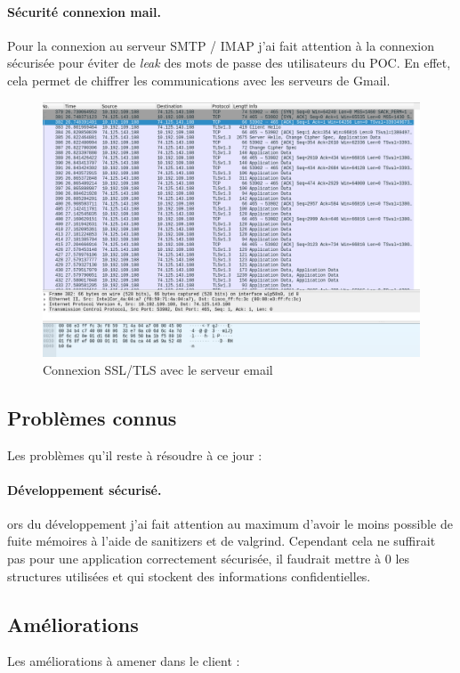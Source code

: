 \paragraph*{Sécurité connexion mail.}
Pour la connexion au serveur SMTP / IMAP j'ai fait attention à la connexion sécurisée pour éviter de \textit{leak} des mots de passe des utilisateurs du POC. En effet, cela permet de chiffrer les communications avec les serveurs de Gmail.
\begin{figure}[h!]
	\centering
	\includegraphics[width=14cm]{images/packetProofEncrypted.png}
	\caption{Connexion SSL/TLS avec le serveur email}
	\label{fig:securityProofEmail}
\end{figure}
\subsection{Problèmes connus}
Les problèmes qu'il reste à résoudre à ce jour :
\paragraph*{Développement sécurisé.}
ors du développement j'ai fait attention au maximum d'avoir le moins possible de fuite mémoires à l'aide de sanitizers et de valgrind. Cependant cela ne suffirait pas pour une application correctement sécurisée, il faudrait mettre à 0 les structures utilisées et qui stockent des informations confidentielles.
\subsection{Améliorations}
Les améliorations à amener dans le client :
